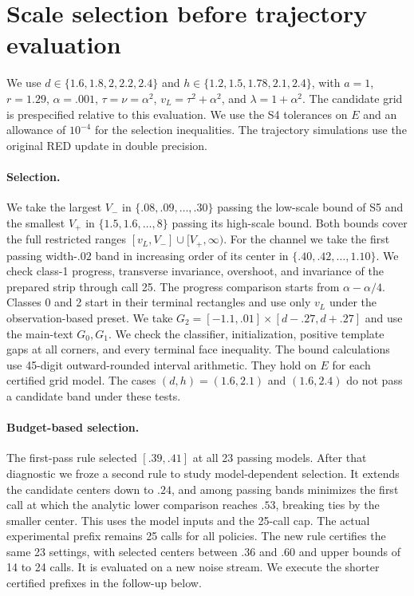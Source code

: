 \section{Scale selection before trajectory evaluation}
\label{sec:selection_diagnostic}
We use $d\in\{1.6,1.8,2,2.2,2.4\}$ and
$h\in\{1.2,1.5,1.78,2.1,2.4\}$, with $a=1$, $r=1.29$,
$\alpha=.001$, $\tau=\nu=\alpha^2$, $v_L=\tau^2+\alpha^2$,
and $\lambda=1+\alpha^2$. The candidate grid is prespecified
relative to this evaluation. We use the S4 tolerances on $E$
and an allowance of $10^{-4}$ for the selection inequalities.
The trajectory simulations use the original RED update in double
precision.

\paragraph{Selection.}
We take the largest $V_-$ in $\{.08,.09,\dots,.30\}$ passing
the low-scale bound of S5 and the smallest $V_+$ in
$\{1.5,1.6,\dots,8\}$ passing its high-scale bound. Both bounds
cover the full restricted ranges $[v_L,V_-]\cup[V_+,\infty)$.
For the channel we take the first passing width-$.02$ band
in increasing order of its center in $\{.40,.42,\ldots,1.10\}$.
We check class-1 progress, transverse invariance, overshoot,
and invariance of the prepared strip through call 25.
The progress comparison starts from $\alpha-\alpha/4$.
Classes 0 and 2 start in their terminal rectangles and use only
$v_L$ under the observation-based preset. We take
$G_2=[-1.1,.01]\times[d-.27,d+.27]$ and use the main-text
$G_0,G_1$. We check the classifier, initialization, positive
template gaps at all corners, and every terminal face inequality.
The bound calculations use 45-digit outward-rounded interval
arithmetic. They hold on $E$ for each certified grid model.
The cases $(d,h)=(1.6,2.1)$ and $(1.6,2.4)$ do not pass a
candidate band under these tests.

\paragraph{Budget-based selection.}
The first-pass rule selected $[.39,.41]$ at all 23 passing
models. After that diagnostic we froze a second rule to
study model-dependent selection. It extends the candidate
centers down to $.24$, and among passing bands minimizes the
first call at which the analytic lower comparison reaches
$.53$, breaking ties by the smaller center. This uses the
model inputs and the 25-call cap. The actual experimental
prefix remains 25 calls for all policies. The new rule
certifies the same 23 settings, with selected centers
between $.36$ and $.60$ and upper bounds of 14 to 24 calls.
It is evaluated on a new noise stream. We execute the
shorter certified prefixes in the follow-up below.

